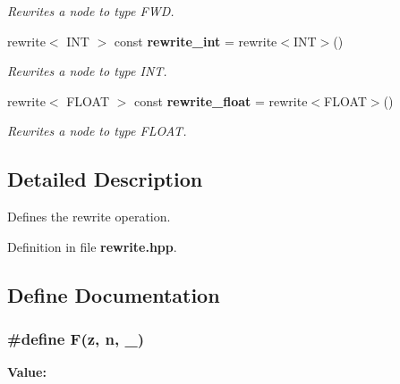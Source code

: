 \begin{CompactItemize}
\begin{CompactList}\small\item\em Rewrites a node to type FWD. \item\end{CompactList}\item 
rewrite$<$ INT $>$ const {\bf rewrite\_\-int} = rewrite$<$INT$>$()\label{namespacesprite_a41}

\begin{CompactList}\small\item\em Rewrites a node to type INT. \item\end{CompactList}\item 
rewrite$<$ FLOAT $>$ const {\bf rewrite\_\-float} = rewrite$<$FLOAT$>$()\label{namespacesprite_a42}

\begin{CompactList}\small\item\em Rewrites a node to type FLOAT. \item\end{CompactList}\end{CompactItemize}


\subsection{Detailed Description}
Defines the rewrite operation. 



Definition in file {\bf rewrite.hpp}.

\subsection{Define Documentation}
\subsubsection{\setlength{\rightskip}{0pt plus 5cm}\#define F(z, n, \_\-)}\label{rewrite_8hpp_a1}


{\bf Value:}

